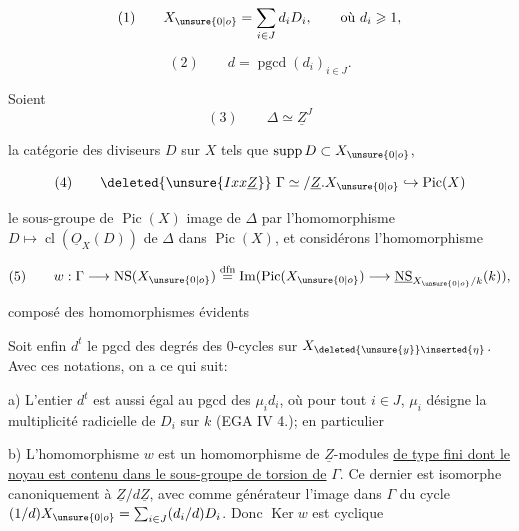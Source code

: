 \[
(1)\qquad X_{\unsure{0|o}}=\sum_{i\in J}d_iD_i,\qquad\text{où }d_i\geqslant1,
\]

\[
(2)\qquad d=\operatorname{pgcd}(d_i)_{i\in J}.
\]

Soient
\[
(3)\qquad\Delta\simeq\underline{Z}^{J}
\]

la catégorie des diviseurs $D$ sur $X$ tels que $\operatorname{supp}D\subset X_{\unsure{0|o}}$, 

\[
(4)\qquad\deleted{\unsure{Ixx\underline Z}}\ \Gamma\simeq/\underline Z.X_{\unsure{0|o}}\hookrightarrow\operatorname{Pic}(X)
\]

le  sous-groupe de $\operatorname{Pic}(X)$ image de $\Delta$ par l'homomorphisme $D\mapsto\operatorname{cl}(\underline{O}_X(D))$ de $\Delta$ dans $\operatorname{Pic}(X)$, et considérons l'homomorphisme 

\[
(5)\qquad w:\Gamma\longrightarrow\operatorname{NS}(X_{\unsure{0|o}})\overset{\mathrm{dfn}}{=}\operatorname{Im}(\operatorname{Pic}(X_{\unsure{0|o}})\longrightarrow\underline{\operatorname{NS}}_{X_{\unsure{0|o}}/k}(k)),
\]

composé des homomorphismes évidents

Soit enfin $d^t$ le pgcd des degrés des 0-cycles sur $X_{\deleted{\unsure{y}}\inserted{\eta}}$. Avec ces notations, on a ce qui suit:

a) L'entier $d^t$ est aussi égal au pgcd des $\mu_i d_i$, où pour tout $i\in J$, $\mu_i$ désigne la multiplicité radicielle de $D_i$ sur $k$ (EGA IV 4.\quad); en particulier     


\margin{$\times$}

b) L'homomorphisme $w$ est un homomorphisme de $\underline Z$-modules \uline{de type fini dont le noyau est contenu dans le sous-groupe de torsion de} $\Gamma$. Ce dernier est isomorphe canoniquement à $\underline Z/d\underline Z$, avec comme générateur l'image dans $\Gamma$ du cycle $(1/d)X_{\unsure{0|o}}=\sum_{i\in J}(d_i/d)D_i$. Donc $\operatorname{Ker}w$ est cyclique

